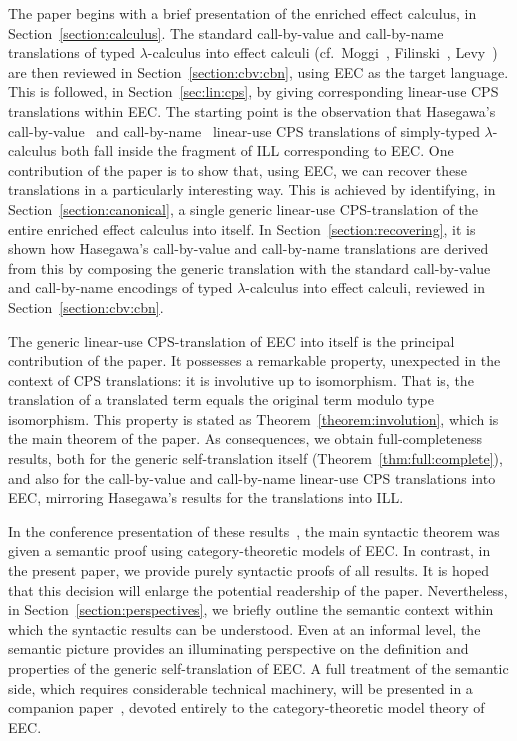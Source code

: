 \documentclass{LMCS}
\begin{document}
The paper 
begins with a brief presentation of the enriched effect
calculus, in Section~\ref{section:calculus}. 
The standard call-by-value and call-by-name translations of typed $\lambda$-calculus
into effect calculi (cf.~Moggi~\cite{Moggi:91},
Filinski~\cite{Filinski:phd}, Levy~\cite{Levy:book})
are then reviewed in Section~\ref{section:cbv:cbn},
using EEC as the target language.
This is followed, in Section~\ref{sec:lin:cps}, by giving corresponding
linear-use CPS translations within EEC.
The starting point is the observation that Hasegawa's
call-by-value~\cite{Hasegawa:Flops:02} 
and call-by-name~\cite{Hasegawa:Flops:04} 
linear-use CPS translations of simply-typed $\lambda$-calculus both
fall inside the fragment of ILL corresponding to EEC. 
One contribution of the paper is to show that, 
using EEC, we can recover these translations in a particularly
interesting way. 
This is achieved by identifying, in Section~\ref{section:canonical}, a single generic linear-use
CPS-translation of the entire enriched effect calculus into itself.
In Section~\ref{section:recovering}, it is shown how
Hasegawa's call-by-value and call-by-name translations are derived
from this by composing the generic translation with the standard  
call-by-value and call-by-name encodings of typed $\lambda$-calculus
into effect calculi, reviewed in Section~\ref{section:cbv:cbn}.

The generic linear-use CPS-translation of EEC into itself
is the principal contribution of the paper. It
possesses a remarkable property, unexpected in the context of
CPS translations: it is involutive up to isomorphism. 
That is, the translation of a translated term equals
the original term modulo type isomorphism. 
This property is stated as Theorem~\ref{theorem:involution}, 
which is the main theorem of the paper. 
As consequences, we obtain full-completeness results, both for
the generic self-translation itself (Theorem~\ref{thm:full:complete}),
and also for the
call-by-value and call-by-name linear-use CPS translations
into EEC, mirroring Hasegawa's results for 
the translations into ILL. 

In the conference presentation of these results~\cite{EMS:fossacs},
the main syntactic theorem was given a semantic proof using  
category-theoretic models of EEC. In contrast, 
in the present paper, we provide purely syntactic proofs of all results.
It is hoped that this decision  will enlarge the potential readership of
the paper. Nevertheless, in Section~\ref{section:perspectives}, we briefly
outline the semantic context within which the syntactic results can be understood.
Even at an informal level, the semantic picture  provides an illuminating perspective
on the definition and properties of the generic self-translation of EEC.
A full treatment of the semantic side, which requires
considerable technical machinery, will be presented in a 
companion paper~\cite{EMSc}, devoted entirely to the category-theoretic model
theory of EEC. 
\end{document}
